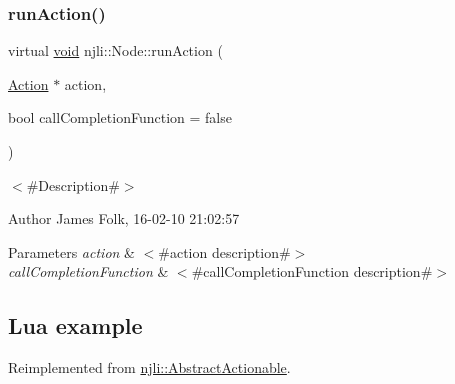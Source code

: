 \subsubsection{\texorpdfstring{run\+Action()}{runAction()}\hspace{0.1cm}{\footnotesize\ttfamily [1/2]}}
{\footnotesize\ttfamily virtual \mbox{\hyperlink{_thread_8h_af1e856da2e658414cb2456cb6f7ebc66}{void}} njli\+::\+Node\+::run\+Action (\begin{DoxyParamCaption}\item[{\mbox{\hyperlink{classnjli_1_1_action}{Action}} $\ast$}]{action,  }\item[{bool}]{call\+Completion\+Function = {\ttfamily false} }\end{DoxyParamCaption})\hspace{0.3cm}{\ttfamily [virtual]}}



$<$\#\+Description\#$>$ 

\begin{DoxyAuthor}{Author}
James Folk, 16-\/02-\/10 21\+:02\+:57
\end{DoxyAuthor}

\begin{DoxyParams}{Parameters}
{\em action} & $<$\#action description\#$>$ \\
\hline
{\em call\+Completion\+Function} & $<$\#call\+Completion\+Function description\#$>$\\
\hline
\end{DoxyParams}
\hypertarget{classnjli_1_1_steering_behavior_wander_ex1}{}\subsection{Lua example}\label{classnjli_1_1_steering_behavior_wander_ex1}

\begin{DoxyCodeInclude}
\end{DoxyCodeInclude}


Reimplemented from \mbox{\hyperlink{classnjli_1_1_abstract_actionable_af2020b25504138eb95c993b3a09c6500}{njli\+::\+Abstract\+Actionable}}.

\mbox{\label{classnjli_1_1_node_a4a5ab73e783b102ffa0c5af0d118e207}} 
